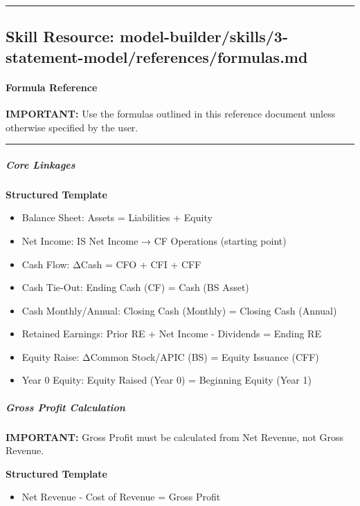 \documentclass[11pt]{article}
\begin{document}
\vspace{0.8em}\hrule\vspace{0.8em}

\subsection{Skill Resource: model-builder/skills/3-statement-model/references/formulas.md}\label{file:model-builder-skills-3-statement-model-references-formulas-md}

\paragraph{Formula Reference}\mbox{}\par

\textbf{IMPORTANT:} Use the formulas outlined in this reference document unless otherwise specified by the user.


\vspace{0.5em}\hrule\vspace{0.5em}

\subparagraph{Core Linkages}\mbox{}\par

\textbf{Structured Template}
\begin{itemize}[leftmargin=*,itemsep=2pt,topsep=2pt]
\item {} Balance Sheet: Assets = Liabilities + Equity
\item {} Net Income: IS Net Income → CF Operations (starting point)
\item {} Cash Flow: ΔCash = CFO + CFI + CFF
\item {} Cash Tie-Out: Ending Cash (CF) = Cash (BS Asset)
\item {} Cash Monthly/Annual: Closing Cash (Monthly) = Closing Cash (Annual)
\item {} Retained Earnings: Prior RE + Net Income - Dividends = Ending RE
\item {} Equity Raise: ΔCommon Stock/APIC (BS) = Equity Issuance (CFF)
\item {} Year 0 Equity: Equity Raised (Year 0) = Beginning Equity (Year 1)
\end{itemize}

\subparagraph{Gross Profit Calculation}\mbox{}\par

\textbf{IMPORTANT:} Gross Profit must be calculated from Net Revenue, not Gross Revenue.


\textbf{Structured Template}
\begin{itemize}[leftmargin=*,itemsep=2pt,topsep=2pt]
\item {} Net Revenue - Cost of Revenue = Gross Profit
\end{itemize}
\end{document}
